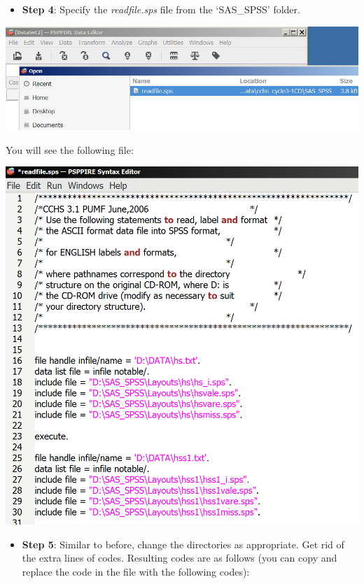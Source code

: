 \documentclass[
]{book}
\providecommand{\tightlist}{%
  \setlength{\itemsep}{0pt}\setlength{\parskip}{0pt}}
\begin{document}
\begin{itemize}
\tightlist
\item
  \textbf{Step 4}: Specify the \emph{readfile.sps} file from the `SAS\_SPSS' folder.
\end{itemize}

\includegraphics[width=0.65\linewidth]{images/abacus33}

You will see the following file:

\includegraphics[width=0.65\linewidth]{images/abacusX33}

\begin{itemize}
\tightlist
\item
  \textbf{Step 5}: Similar to before, change the directories as appropriate. Get rid of the extra lines of codes. Resulting codes are as follows (you can copy and replace the code in the file with the following codes):
\end{itemize}
\end{document}
